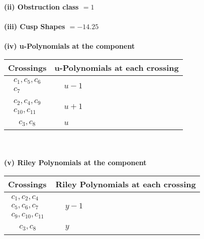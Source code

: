 \documentclass[1p]{elsarticle_modified}
\theoremstyle{definition}
\begin{document}
\flushleft \textbf{(ii) Obstruction class $= 1$}\\~\\
\flushleft \textbf{(iii) Cusp Shapes $= -14.25$}\\~\\
\newpage\renewcommand{\arraystretch}{1}
\flushleft \textbf{(iv) u-Polynomials at the component}\newline \\
\begin{tabular}{m{50pt}|m{274pt}}
Crossings & \hspace{64pt}u-Polynomials at each crossing \\
\hline $$\begin{aligned}c_{1},c_{5},c_{6}\\c_{7}\end{aligned}$$&$\begin{aligned}
&u-1
\end{aligned}$\\
\hline $$\begin{aligned}c_{2},c_{4},c_{9}\\c_{10},c_{11}\end{aligned}$$&$\begin{aligned}
&u+1
\end{aligned}$\\
\hline $$\begin{aligned}c_{3},c_{8}\end{aligned}$$&$\begin{aligned}
&u
\end{aligned}$\\
\hline
\end{tabular}\\~\\
\newpage\renewcommand{\arraystretch}{1}
\flushleft \textbf{(v) Riley Polynomials at the component}\newline \\
\begin{tabular}{m{50pt}|m{274pt}}
Crossings & \hspace{64pt}Riley Polynomials at each crossing \\
\hline $$\begin{aligned}c_{1},c_{2},c_{4}\\c_{5},c_{6},c_{7}\\c_{9},c_{10},c_{11}\end{aligned}$$&$\begin{aligned}
&y-1
\end{aligned}$\\
\hline $$\begin{aligned}c_{3},c_{8}\end{aligned}$$&$\begin{aligned}
&y
\end{aligned}$\\
\hline
\end{tabular}\\~\\
\end{document}
